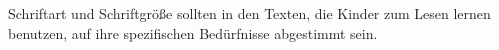 Schriftart und Schriftgröße sollten in den Texten, die Kinder zum Lesen lernen benutzen, auf ihre spezifischen Bedürfnisse abgestimmt sein.